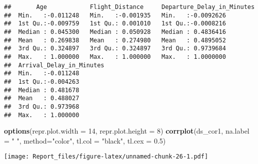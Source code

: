 \documentclass[
]{article}
\newenvironment{Shaded}{\begin{snugshade}}{\end{snugshade}}
\newcommand{\AttributeTok}[1]{\textcolor[rgb]{0.13,0.29,0.53}{#1}}
\newcommand{\DecValTok}[1]{\textcolor[rgb]{0.00,0.00,0.81}{#1}}
\newcommand{\FloatTok}[1]{\textcolor[rgb]{0.00,0.00,0.81}{#1}}
\newcommand{\FunctionTok}[1]{\textcolor[rgb]{0.13,0.29,0.53}{\textbf{#1}}}
\newcommand{\NormalTok}[1]{#1}
\newcommand{\StringTok}[1]{\textcolor[rgb]{0.31,0.60,0.02}{#1}}
\begin{document}
\begin{verbatim}
##       Age            Flight_Distance     Departure_Delay_in_Minutes
##  Min.   :-0.011248   Min.   :-0.001935   Min.   :-0.0092626        
##  1st Qu.:-0.009759   1st Qu.: 0.001010   1st Qu.:-0.0008216        
##  Median : 0.045300   Median : 0.050928   Median : 0.4836416        
##  Mean   : 0.269838   Mean   : 0.274980   Mean   : 0.4895052        
##  3rd Qu.: 0.324897   3rd Qu.: 0.324897   3rd Qu.: 0.9739684        
##  Max.   : 1.000000   Max.   : 1.000000   Max.   : 1.0000000        
##  Arrival_Delay_in_Minutes
##  Min.   :-0.011248       
##  1st Qu.:-0.004263       
##  Median : 0.481678       
##  Mean   : 0.488027       
##  3rd Qu.: 0.973968       
##  Max.   : 1.000000
\end{verbatim}

\begin{Shaded}
\begin{Highlighting}[]
\FunctionTok{options}\NormalTok{(}\AttributeTok{repr.plot.width =} \DecValTok{14}\NormalTok{, }\AttributeTok{repr.plot.height =} \DecValTok{8}\NormalTok{)}
\FunctionTok{corrplot}\NormalTok{(ds\_cor1, }\AttributeTok{na.label =} \StringTok{" "}\NormalTok{, }\AttributeTok{method=}\StringTok{"color"}\NormalTok{, }\AttributeTok{tl.col =} \StringTok{"black"}\NormalTok{, }\AttributeTok{tl.cex =} \FloatTok{0.5}\NormalTok{)}
\end{Highlighting}
\end{Shaded}

\texttt{[image: Report\_files/figure-latex/unnamed-chunk-26-1.pdf]}
\end{document}
